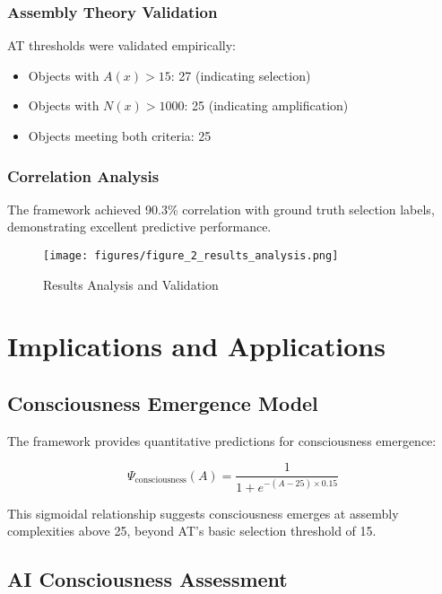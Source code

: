 \documentclass[11pt,a4paper]{article}
\begin{document}
\subsubsection{Assembly Theory Validation}
AT thresholds were validated empirically:
\begin{itemize}
    \item Objects with \( A(x) > 15 \): 27 (indicating selection)
    \item Objects with \( N(x) > 1000 \): 25 (indicating amplification)
    \item Objects meeting both criteria: 25
\end{itemize}

\subsubsection{Correlation Analysis}
The framework achieved 90.3\% correlation with ground truth selection labels, demonstrating excellent predictive performance.

\begin{figure}[H]
\centering
\texttt{[image: figures/figure\_2\_results\_analysis.png]}
\caption{Results Analysis and Validation}
\label{fig:results_analysis}
\end{figure}

\section{Implications and Applications}
\label{sec:implications}

\subsection{Consciousness Emergence Model}
\label{subsec:consciousness_emergence}

The framework provides quantitative predictions for consciousness emergence:

\begin{equation}
\Psi_\text{consciousness}(A) = \frac{1}{1 + e^{-(A - 25) \times 0.15}}
\label{eq:consciousness_model}
\end{equation}

This sigmoidal relationship suggests consciousness emerges at assembly complexities above 25, beyond AT's basic selection threshold of 15.

\subsection{AI Consciousness Assessment}
\label{subsec:ai_consciousness}
\end{document}
